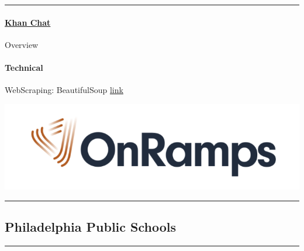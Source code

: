 \documentclass[
]{article}
\begin{document}
\begin{center}\rule{0.5\linewidth}{0.5pt}\end{center}

\begin{row}

\begin{col-sm-6}

\hypertarget{khan-chat}{%
\paragraph{\texorpdfstring{\href{https://katjanewilson.github.io/WhartonAnalytics-MLB/}{Khan
Chat}}{Khan Chat}}\label{khan-chat}}

Overview

\hypertarget{technical-1}{%
\paragraph{Technical}\label{technical-1}}

WebScraping: BeautifulSoup
\href{https://www.crummy.com/software/BeautifulSoup/bs4/doc/}{link}

\end{col-sm-6}

\begin{col-sm-6}

\includegraphics[width=800px]{images/onramps}

\end{col-sm-6}

\end{row}

\begin{center}\rule{0.5\linewidth}{0.5pt}\end{center}

\hypertarget{philadelphia-public-schools}{%
\subsection{Philadelphia Public
Schools}\label{philadelphia-public-schools}}

\begin{center}\rule{0.5\linewidth}{0.5pt}\end{center}
\end{document}
